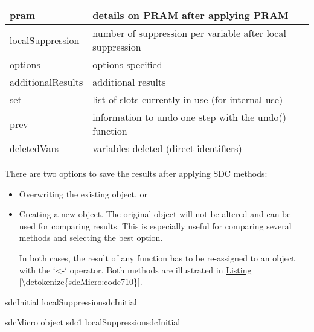 \documentclass[letterpaper,10pt,english]{sphinxmanual}
\begin{document}
\begin{savenotes}
\begin{tabulary}{\linewidth}[t]{|T|T|}
\hline
pram
&
details on PRAM after applying
PRAM
\\
\hline
localSuppression
&
number of suppression per
variable after local suppression
\\
\hline
options
&
options specified
\\
\hline
additionalResults
&
additional results
\\
\hline
set
&
list of slots currently in use
(for internal use)
\\
\hline
prev
&
information to undo one step with
the undo() function
\\
\hline
deletedVars
&
variables deleted (direct
identifiers)
\\
\hline
\end{tabulary}
\par
\sphinxattableend\end{savenotes}

There are two options to save the results after applying SDC methods:
\begin{itemize}
\item {} 
Overwriting the existing  object, or

\item {} 
Creating a new  object. The original object will not be
altered and can be used for comparing results. This is especially
useful for comparing several methods and selecting the best option.

In both cases, the result of any function has to be re-assigned to an
object with the ‘\textless{}-‘ operator. Both methods are illustrated in
\hyperref[\detokenize{sdcMicro:code710}]{Listing \ref{\detokenize{sdcMicro:code710}}}.

\end{itemize}

\def\sphinxLiteralBlockLabel{\label{\detokenize{sdcMicro:code710}}}
%
\begin{sphinxVerbatim}[commandchars=\\\{\},numbers=left,firstnumber=1,stepnumber=1]
     sdcInitial  localSuppressionsdcInitial

     sdcMicro object
     sdc1  localSuppressionsdcInitial
\end{sphinxVerbatim}
\end{document}
